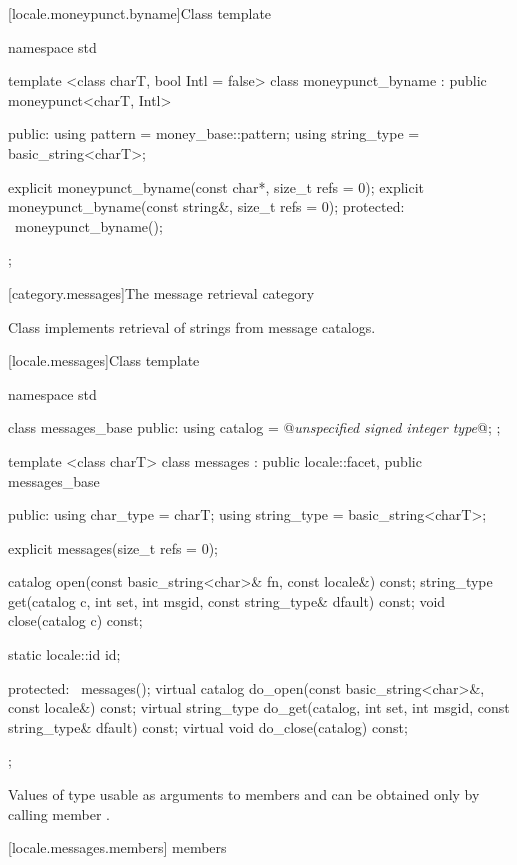 [locale.moneypunct.byname]{Class template }

%
\begin{codeblock}
namespace std {
  template <class charT, bool Intl = false>
  class moneypunct_byname : public moneypunct<charT, Intl> {
  public:
    using pattern     = money_base::pattern;
    using string_type = basic_string<charT>;

    explicit moneypunct_byname(const char*, size_t refs = 0);
    explicit moneypunct_byname(const string&, size_t refs = 0);
  protected:
    ~moneypunct_byname();
  };
}
\end{codeblock}

[category.messages]{The message retrieval category}

\pnum
Class
implements retrieval of strings from message catalogs.

[locale.messages]{Class template }

%
\begin{codeblock}
namespace std {
  class messages_base {
  public:
    using catalog = @\textit{unspecified signed integer type}@;
  };

  template <class charT>
  class messages : public locale::facet, public messages_base {
  public:
    using char_type   = charT;
    using string_type = basic_string<charT>;

    explicit messages(size_t refs = 0);

    catalog open(const basic_string<char>& fn, const locale&) const;
    string_type get(catalog c, int set, int msgid,
                     const string_type& dfault) const;
    void close(catalog c) const;

    static locale::id id;

  protected:
    ~messages();
    virtual catalog do_open(const basic_string<char>&, const locale&) const;
    virtual string_type do_get(catalog, int set, int msgid,
                               const string_type& dfault) const;
    virtual void do_close(catalog) const;
  };
}
\end{codeblock}

\pnum
Values of type
usable as arguments to members
and
can be obtained only by calling member
.

[locale.messages.members]{ members}

